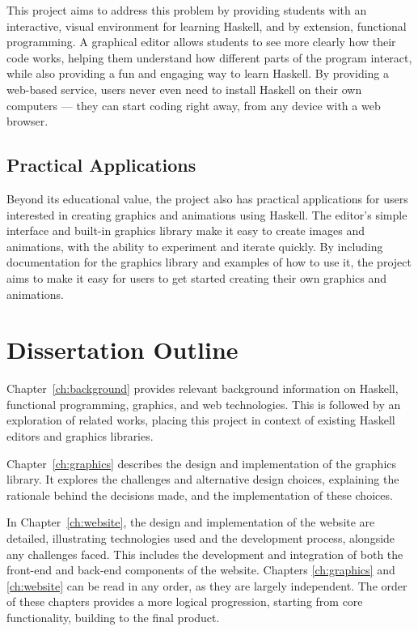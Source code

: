 \documentclass[../main.tex]{subfiles}
\begin{document}
            This project aims to address this problem by providing students with an
                interactive, visual environment for learning Haskell, and by extension,
                functional programming.
            A graphical editor allows students to see more clearly how their code works,
                helping them understand how different parts of the program interact, while also
                providing a fun and engaging way to learn Haskell.
            By providing a web-based service, users never even need to install Haskell on
                their own computers — they can start coding right away, from any device with a
                web browser.

        \subsection{Practical Applications}
            Beyond its educational value, the project also has practical applications for
                users interested in creating graphics and animations using Haskell.
            The editor's simple interface and built-in graphics library make it easy to
                create images and animations, with the ability to experiment and iterate
                quickly.
            By including documentation for the graphics library and examples of how to use
                it, the project aims to make it easy for users to get started creating their
                own graphics and animations.

    \section{Dissertation Outline}
        Chapter~\ref{ch:background} provides relevant background information on
            Haskell, functional programming, graphics, and web technologies.
        This is followed by an exploration of related works, placing this project in
            context of existing Haskell editors and graphics libraries.

        Chapter~\ref{ch:graphics} describes the design and implementation of the
            graphics library.
        It explores the challenges and alternative design choices, explaining the
            rationale behind the decisions made, and the implementation of these choices.

        In Chapter~\ref{ch:website}, the design and implementation of the website are
            detailed, illustrating technologies used and the development process, alongside
            any challenges faced.
        This includes the development and integration of both the front-end and
            back-end components of the website.
        Chapters \ref{ch:graphics} and \ref{ch:website} can be read in any order, as
            they are largely independent.
        The order of these chapters provides a more logical progression, starting from
            core functionality, building to the final product.
\end{document}
